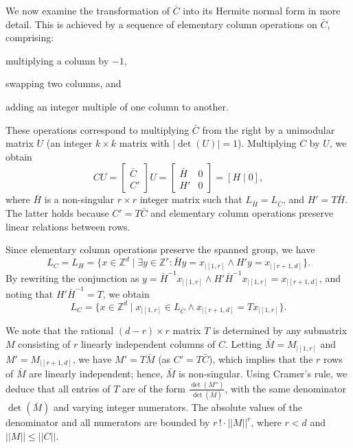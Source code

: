 \documentclass[11pt,a4paper]{amsart}
\newcommand{\nnorm}[1]{||#1||}
\newcommand{\Zset}{\mathbb{Z}}
\newcommand{\restr}[1]{_{|{#1}}}
\newcommand{\setZ}{\Zset}
\theoremstyle{plain}
\theoremstyle{definition}
\theoremstyle{defC}
\theoremstyle{thmC}
\begin{document}
We now examine the transformation of $\bar{C}$ into its Hermite normal
form in more detail. This is achieved by a sequence of elementary
column operations on $\bar{C}$, comprising: 
\begin{enumerate*}[(i)]
    \item multiplying a column by $-1$, 
    \item swapping two columns, and 
    \item adding an integer multiple of one column to another.
\end{enumerate*}
These operations correspond to multiplying $\bar{C}$ from the right by a unimodular matrix $U$ (an integer $k \times k$ matrix with $|\det(U)| = 1$). Multiplying $C$ by $U$, we obtain
\[
	CU = \begin{bmatrix} \bar{C} \\ C' \end{bmatrix} U = 
		\begin{bmatrix} \bar{H} & 0 \\ H' & 0 \end{bmatrix} = [H \mid 0],
\]
where $\bar{H}$ is a non-singular $r \times r$ integer matrix such
that $L_{\bar{H}}
= L_{\bar{C}}$, and $H' = T\bar{H}$. The latter holds because $C' = T\bar{C}$ and elementary column operations preserve linear relations between rows.

Since elementary column operations preserve the spanned group, we have
\[
    L_{C} = L_{H} = \{x \in \setZ^d \mid \exists y \in
    \setZ^r : \bar{H}y = x\restr{[1,r]} \land H'y = x\restr{[r+1,d]}\}.
\]
By rewriting the conjunction as $y = \bar{H}^{-1}x\restr{[1,r]}\land
H'\bar{H}^{-1}x\restr{[1,r]} = x\restr{[r+1,d]}$, and noting that
$H'\bar{H}^{-1} = T$, we obtain
\begin{equation}\label{eq:LbarC}
	L_{C}=\{x\in\setZ^d\mid x\restr{[1,r]}\in L_{\bar{C}}\land
x\restr{[r+1,d]}=T x\restr{[1,r]}\}.
\end{equation}

\noindent
We note that the rational $(d{-}r)\times r$ matrix $T$ is determined
by any submatrix $M$ consisting of 
$r$ linearly independent columns of $C$.
Letting
$\bar{M}=M\restr{[1,r]}$
and $M'=M\restr{[r+1,d]}$, we have $M'=T\bar{M}$ (as $C'=T\bar{C}$), which
implies that the $r$ rows of $\bar{M}$ are linearly independent;
hence, $\bar{M}$
is non-singular.
 Using Cramer's rule,
we deduce that all entries of $T$ are of the form
$\frac{\det(M'')}{\det(\bar{M})}$, with the same denominator
$\det(\bar{M})$ and
varying integer numerators. The absolute values of the denominator and all numerators are
bounded by $r\,!\cdot \nnorm{M}^r$, where $r<d$ and $\nnorm{M}\leq \nnorm{C}$.
\end{document}
